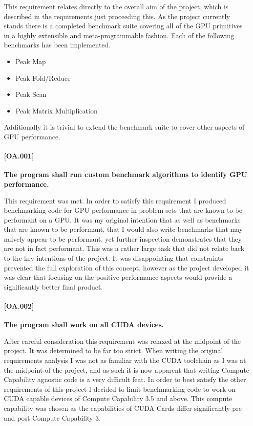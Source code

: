 This requirement relates directly to the overall aim of the project, which is described in the
requirements just proceeding this. As the project currently stands there is a completed benchmark
suite covering all of the GPU primitives in a highly extensible and meta-programmable fashion. Each
of the following benchmarks has been implemented.

\begin{itemize}
\item Peak Map
\item Peak Fold/Reduce
\item Peak Scan
\item Peak Matrix Multiplication
\end{itemize}

Additionally it is trivial to extend the benchmark suite to cover other aspects of GPU performance.

\paragraph{[OA.001]} \label{[OA.001]}
\textbf{The program shall run custom benchmark algorithms to identify GPU performance.}

This requirement was met. In order to satisfy this requirement I produced benchmarking code for GPU
performance in problem sets that are known to be performant on a GPU. It was my original intention
that as well as benchmarks that are known to be performant, that I would also write benchmarks that
may naively appear to be performant, yet further inspection demonstrates that they are not in fact
performant. This was a rather large task that did not relate back to the key intentions of the
project. It was disappointing that constraints prevented the full exploration of this concept,
however as the project developed it was clear that focusing on the positive performance aspects
would provide a significantly better final product.

\paragraph{[OA.002]}
\textbf{The program shall work on all CUDA devices.}

After careful consideration this requirement was relaxed at the midpoint of the project. It was
determined to be far too strict. When writing the original requirements analysis I was not as
familiar with the CUDA toolchain as I was at the midpoint of the project, and as such it is now
apparent that writing Compute Capability agnostic code is a very difficult feat. In order to best
satisfy the other requirements of this project I decided to limit benchmarking code to work on CUDA
capable devices of Compute Capability 3.5 and above. This compute capability was chosen as the
capabilities of CUDA Cards differ significantly pre and post Compute Capability 3. 

